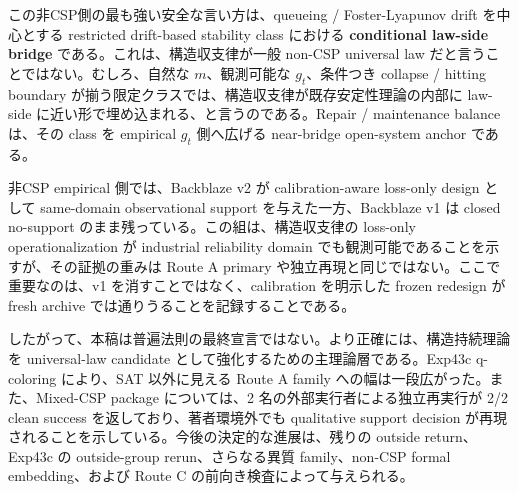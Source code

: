 \documentclass[12pt,a4paper]{article}
\begin{document}
この非CSP側の最も強い安全な言い方は、queueing / Foster-Lyapunov drift を中心とする restricted drift-based stability class における \textbf{conditional law-side bridge} である。これは、構造収支律が一般 non-CSP universal law だと言うことではない。むしろ、自然な \(m\)、観測可能な \(g_{t}\)、条件つき collapse / hitting boundary が揃う限定クラスでは、構造収支律が既存安定性理論の内部に law-side に近い形で埋め込まれる、と言うのである。Repair / maintenance balance は、その class を empirical \(g_{t}\) 側へ広げる near-bridge open-system anchor である。

非CSP empirical 側では、Backblaze v2 が calibration-aware loss-only design として same-domain observational support を与えた一方、Backblaze v1 は closed no-support のまま残っている。この組は、構造収支律の loss-only operationalization が industrial reliability domain でも観測可能であることを示すが、その証拠の重みは Route A primary や独立再現と同じではない。ここで重要なのは、v1 を消すことではなく、calibration を明示した frozen redesign が fresh archive では通りうることを記録することである。

したがって、本稿は普遍法則の最終宣言ではない。より正確には、構造持続理論を universal-law candidate として強化するための主理論層である。Exp43c q-coloring により、SAT 以外に見える Route A family への幅は一段広がった。また、Mixed-CSP package については、2 名の外部実行者による独立再実行が 2/2 clean success を返しており、著者環境外でも qualitative support decision が再現されることを示している。今後の決定的な進展は、残りの outside return、Exp43c の outside-group rerun、さらなる異質 family、non-CSP formal embedding、および Route C の前向き検査によって与えられる。
\end{document}
